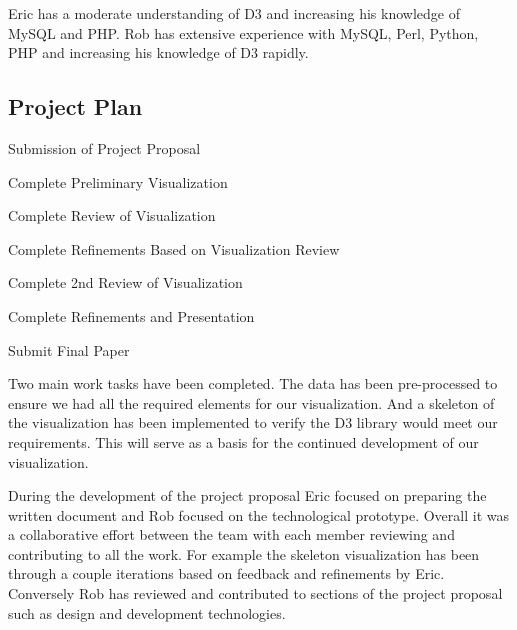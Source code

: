 \documentclass[12pt,letterpaper]{article}
\begin{document}
Eric has a moderate understanding of D3 and increasing his knowledge of MySQL and PHP.  Rob has extensive experience with MySQL, Perl, Python, PHP and increasing his knowledge of D3 rapidly.

\subsection{Project Plan}
\begin{description}[leftmargin=7em, style=nextline]
\item [26 Oct 2018] Submission of Project Proposal
\item [04 Nov 2018] Complete Preliminary Visualization
\item [11 Nov 2018] Complete Review of Visualization
\item [18 Nov 2018] Complete Refinements Based on Visualization Review
\item [25 Nov 2018] Complete 2nd Review of Visualization
\item [30 Nov 2018] Complete Refinements and Presentation
\item [14 Dec 2018] Submit Final Paper
\end{description}

Two main work tasks have been completed.  The data has been pre-processed to ensure we had all the required elements for our visualization.  And a skeleton of the visualization has been implemented to verify the D3 library would meet our requirements.  This will serve as a basis for the continued development of our visualization.

During the development of the project proposal Eric focused on preparing the written document and Rob focused on the technological prototype.  Overall it was a collaborative effort between the team with each member reviewing and contributing to all the work.  For example the skeleton visualization has been through a couple iterations based on feedback and refinements by Eric.  Conversely Rob has reviewed and contributed to sections of the project proposal such as design and development technologies.

\printbibliography
\end{document}
